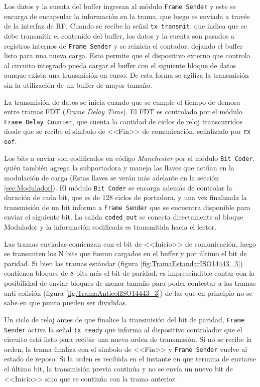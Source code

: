Los datos y la cuenta del buffer ingresan al módulo 
\lstinline{Frame Sender} y este se encarga de encapsular la información 
en la trama, que luego es enviada a través de la interfaz de RF. Cuando 
se recibe la señal \lstinline{tx transmit}, que indica que se debe 
transmitir el contenido del buffer, los datos y la cuenta son pasados a 
registros internos de \lstinline{Frame Sender} y se reinicia el 
contador, dejando el buffer listo para una nueva carga. Esto permite que 
el dispositivo externo que controla al circuito integrado pueda 
cargar el buffer con el siguiente bloque de datos aunque exista una 
transmisión en curso. De esta forma se agiliza la transmisión sin la 
utilización de un buffer de mayor tamaño.

La transmisión de datos se inicia cuando que se cumple el tiempo de 
demora entre tramas FDT (\emph{Frame Delay Time}). El FDT es 
controlado por el módulo \lstinline{Frame Delay Counter}, que cuenta 
la cantidad de ciclos de reloj transcurridos desde que se recibe el 
símbolo de <<Fin>> de comunicación, señalizado por \lstinline{rx eof}. 

Los bits a enviar son codificados en código \emph{Manchester} por el 
módulo \lstinline{Bit Coder}, quién también agrega la subportadora y 
maneja las llaves que actúan en la modulación de carga (Estas llaves 
se verán más adelante en la sección \ref{sec:Modulador}). El módulo 
\lstinline{Bit Coder} se encarga además de controlar la duración 
de cada bit, que es de 128 ciclos de portadora, y una vez finalizada la 
transmisión de un bit informa a \lstinline{Frame Sender} que se 
encuentra disponible para enviar el siguiente bit. La salida 
\lstinline{coded_out} se conecta directamente al bloque Modulador y la 
información codificada es transmitida hacia el lector.

Las tramas enviadas comienzan con el bit de <<Inicio>> de 
comunicación, luego se transmiten los N bits que fueron cargados en 
el buffer y por último el bit de paridad. Si bien las tramas estándar 
(figura \ref{fig:TramaEstandarISO14443_3}) contienen bloques de 8 bits 
más el bit de paridad, es imprescindible contar con la posibilidad de 
enviar bloques de menor tamaño para poder contestar a las tramas 
anti-colisión (figura \ref{fig:TramaAnticolISO14443_3}) de las que en 
principio no se sabe en que punto pueden ser divididas.

Un ciclo de reloj antes de que finalice la transmisión del bit de paridad,
\lstinline{Frame Sender} activa la señal \lstinline{tx ready} que 
informa al dispositivo controlador que el circuito está 
listo para recibir una nueva orden de transmisión. Si no se recibe la 
orden, la trama finaliza con el símbolo de <<Fin>> y 
\lstinline{Frame Sender} vuelve al estado de reposo. Si la orden es 
recibida en el instante en que termina de enviarse el último bit, la 
transmisión previa continúa y no se envía un nuevo bit de <<Inicio>> 
sino que se continúa con la trama anterior. 

